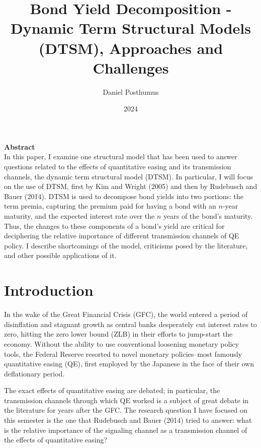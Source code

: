 \documentclass[12pt,final]{article}
\title{Bond Yield Decomposition - Dynamic Term Structural Models (DTSM), Approaches and Challenges}
\author{Daniel Posthumus}
\date{2024}
\begin{document}
\maketitle

\begin{center}
\textbf{\large Abstract} \\
In this paper, I examine one structural model that has been used to answer questions related to the effects of quantitative easing and its transmission channels, the dynamic term structural model (DTSM). In particular, I will focus on the use of DTSM, first by Kim and Wright (2005) and then by Rudebusch and Bauer (2014). DTSM is used to decompose bond yields into two portions: the term premia, capturing the premium paid for having a bond with an $n$-year maturity, and the expected interest rate over the $n$ years of the bond's maturity. Thus, the changes to these components of a bond's yield are critical for deciphering the relative importance of different transmission channels of QE policy. I describe shortcomings of the model, criticisms posed by the literature, and other possible applications of it.
\end{center}
\vspace{0.2in}
\clearpage

\tableofcontents

\section{Introduction}

In the wake of the Great Financial Crisis (GFC), the world entered a period of disinflation and stagnant growth as central banks desperately cut interest rates to zero, hitting the zero lower bound (ZLB) in their efforts to jump-start the economy. Without the ability to use conventional loosening monetary policy tools, the Federal Reserve resorted to novel monetary policies--most famously quantitative easing (QE), first employed by the Japanese in the face of their own deflationary period. 

The exact effects of quantitative easing are debated; in particular, the transmission channels through which QE worked is a subject of great debate in the literature for years after the GFC. The research question I have focused on this semester is the one that Rudebusch and Bauer (2014) tried to answer: what is the relative importance of the signaling channel as a transmission channel of the effects of quantitative easing? \citep{Bauer2014}
\end{document}
